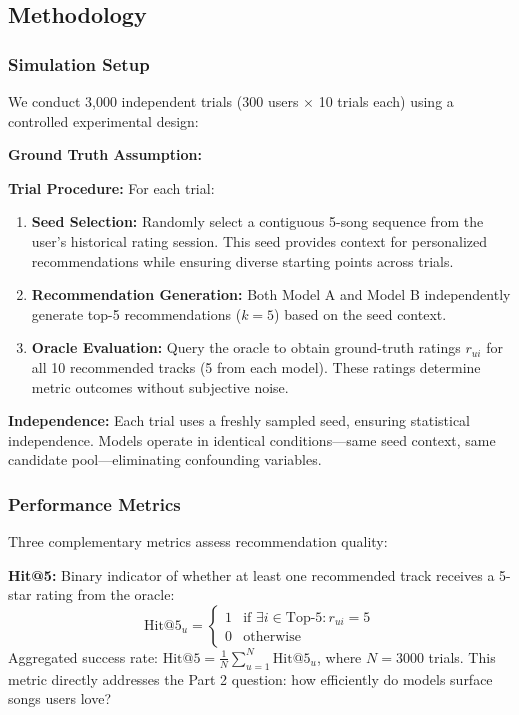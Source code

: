 \documentclass[12pt,a4paper]{article}
\begin{document}
\subsection{Methodology}

\subsubsection{Simulation Setup}

We conduct 3,000 independent trials (300 users $\times$ 10 trials each) using a controlled experimental design:

\textbf{Ground Truth Assumption:} %

\textbf{Trial Procedure:} For each trial:
\begin{enumerate}
    \item \textbf{Seed Selection:} Randomly select a contiguous 5-song sequence from the user's historical rating session. This seed provides context for personalized recommendations while ensuring diverse starting points across trials.
    
    \item \textbf{Recommendation Generation:} Both Model A and Model B independently generate top-5 recommendations ($k=5$) based on the seed context.
    
    \item \textbf{Oracle Evaluation:} Query the oracle to obtain ground-truth ratings $r_{ui}$ for all 10 recommended tracks (5 from each model). These ratings determine metric outcomes without subjective noise.
\end{enumerate}

\textbf{Independence:} Each trial uses a freshly sampled seed, ensuring statistical independence. Models operate in identical conditions—same seed context, same candidate pool—eliminating confounding variables.

\subsubsection{Performance Metrics}

Three complementary metrics assess recommendation quality:

\textbf{Hit@5:} Binary indicator of whether at least one recommended track receives a 5-star rating from the oracle:
\begin{equation}
\text{Hit@5}_u = \begin{cases}
1 & \text{if } \exists i \in \text{Top-5}: r_{ui} = 5 \\
0 & \text{otherwise}
\end{cases}
\end{equation}
Aggregated success rate: $\text{Hit@5} = \frac{1}{N} \sum_{u=1}^{N} \text{Hit@5}_u$, where $N=3000$ trials. This metric directly addresses the Part 2 question: how efficiently do models surface songs users love?
\end{document}

